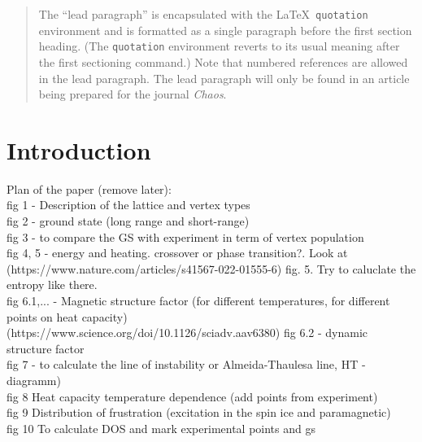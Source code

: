 \documentclass[pre,reprint,superscriptaddress]{revtex4-2}
\begin{document}
\begin{quotation}
The ``lead paragraph'' is encapsulated with the \LaTeX\ 
\verb+quotation+ environment and is formatted as a single paragraph before the first section heading. 
(The \verb+quotation+ environment reverts to its usual meaning after the first sectioning command.) 
Note that numbered references are allowed in the lead paragraph.
%
The lead paragraph will only be found in an article being prepared for the journal \textit{Chaos}.
\end{quotation}

\section{Introduction}
Plan of the paper (remove later):\\
fig 1 - Description of the lattice and vertex types\\
fig 2 - ground state (long range and short-range)\\
fig 3 - to compare the GS with experiment in term of vertex population\\
fig 4, 5 -  energy and heating. crossover or phase transition?.
Look at (https://www.nature.com/articles/s41567-022-01555-6) fig. 5. Try to caluclate the entropy like there.\\
fig 6.1,... - Magnetic structure factor (for different temperatures, for different points on heat capacity)\\ (https://www.science.org/doi/10.1126/sciadv.aav6380)
fig 6.2 - dynamic structure factor \\
fig 7  - to calculate the line of instability or Almeida-Thaulesa line, HT -diagramm)\\ 
fig 8 Heat capacity temperature dependence (add points from experiment)\\
fig 9 Distribution of frustration (excitation in the spin ice and paramagnetic)\\
fig 10 To calculate DOS and mark experimental points and gs
 
\end{document}
